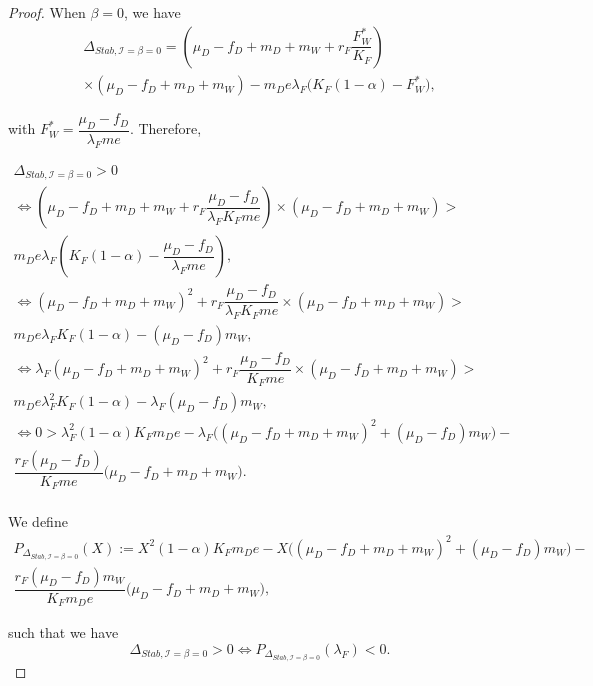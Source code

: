 \documentclass{article}
\newcommand{\lfw}{\lambda_{F}}
\newcommand{\lfw}{\lambda_{F}}
\newcommand{\cI}{\mathcal{I}}
\begin{document}
\begin{proof}
When $\beta = 0$, we have
\begin{multline} \label{DeltaStab, generalCase}
\Delta_{Stab, \cI =\beta = 0} =  \left(\mu_D - f_D + m_D + m_W + r_F\dfrac{F_W^*}{K_F} \right) \\ \times   \left( \mu_D -f_D + m_D + m_W \right) - m_D e \lfw \Big(K_F(1-\alpha) - F_W^* \Big),
\end{multline}

with $F_W^* = \dfrac{\mu_D - f_D}{\lfw m e}$. Therefore,

\begin{multline*}
\Delta_{Stab, \cI=\beta = 0} > 0 \\
\Leftrightarrow \left(\mu_D - f_D + m_D + m_W + r_F \dfrac{\mu_D - f_D}{\lfw K_F m e} \right) \times   \left( \mu_D -f_D + m_D + m_W \right) > \\ m_D e \lfw \left(K_F(1-\alpha) - \dfrac{\mu_D - f_D}{\lfw m e} \right), \\
\Leftrightarrow (\mu_D - f_D + m_D + m_W)^2 + r_F \dfrac{\mu_D - f_D}{\lfw K_F m e}  \times   \left( \mu_D -f_D + m_D + m_W \right) > \\ m_D e \lfw K_F(1-\alpha) - (\mu_D - f_D)m_W , \\
\Leftrightarrow \lfw (\mu_D - f_D + m_D + m_W)^2 + r_F \dfrac{\mu_D - f_D}{K_F m e}  \times   \left( \mu_D -f_D + m_D + m_W \right) > \\ m_D e \lfw^2 K_F(1-\alpha) - \lfw (\mu_D - f_D)m_W , \\
\Leftrightarrow 0 > \lfw^2 (1-\alpha) K_F  m_D e - \lfw \Big((\mu_D - f_D + m_D + m_W)^2 +(\mu_D - f_D)m_W \Big) - \\ \dfrac{r_F (\mu_D - f_D) }{K_F m e}  \big( \mu_D -f_D + m_D + m_W \big).\\
\end{multline*}

We define 
\begin{multline*}
P_{\Delta_{Stab, \cI= \beta = 0}}(X) := X^2 (1-\alpha) K_F  m_D e - X \Big((\mu_D - f_D + m_D + m_W)^2 +(\mu_D - f_D)m_W \Big) - \\ \dfrac{r_F (\mu_D - f_D) m_W}{K_F m_D e}  \big( \mu_D -f_D + m_D + m_W \big),
\end{multline*} 

such that we have 
\begin{equation}
\Delta_{Stab, \cI= \beta = 0} > 0 \Leftrightarrow P_{\Delta_{Stab, \cI= \beta = 0}}(\lfw) < 0.
\label{equivalenceDeltaStabP}
\end{equation}


\end{proof}
\end{document}
